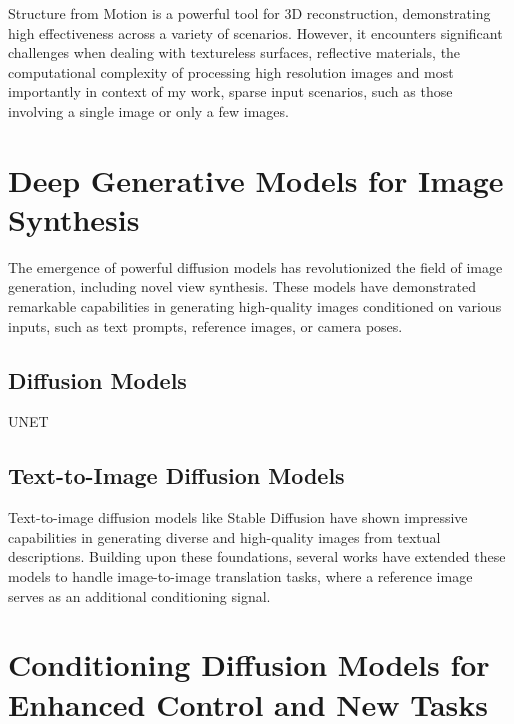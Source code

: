 Structure from Motion is a powerful tool for 3D reconstruction,
demonstrating high effectiveness across a variety of scenarios.
However, it encounters significant challenges when dealing with
textureless surfaces, reflective materials, the computational
complexity of processing high resolution images and most importantly
in context of my work, sparse input scenarios, such as those
involving a single image or only a few images.


\section{Deep Generative Models for Image Synthesis}\label{sec:text-to-image}

The emergence of powerful diffusion models has revolutionized the
field of image generation, including novel view synthesis. These
models have demonstrated remarkable capabilities in generating
high-quality images conditioned on various inputs, such as text
prompts, reference images, or camera poses.

\subsection{Diffusion Models}

UNET

\subsection{Text-to-Image Diffusion Models}

Text-to-image diffusion models like Stable Diffusion
\cite{stablediffusion} have shown impressive capabilities in
generating diverse and high-quality images from textual descriptions.
Building upon these foundations, several works have extended these
models to handle image-to-image translation tasks, where a reference
image serves as an additional conditioning signal.

\section{Conditioning Diffusion Models for Enhanced Control and New
Tasks}\label{sec:conditioning-diffusion}

